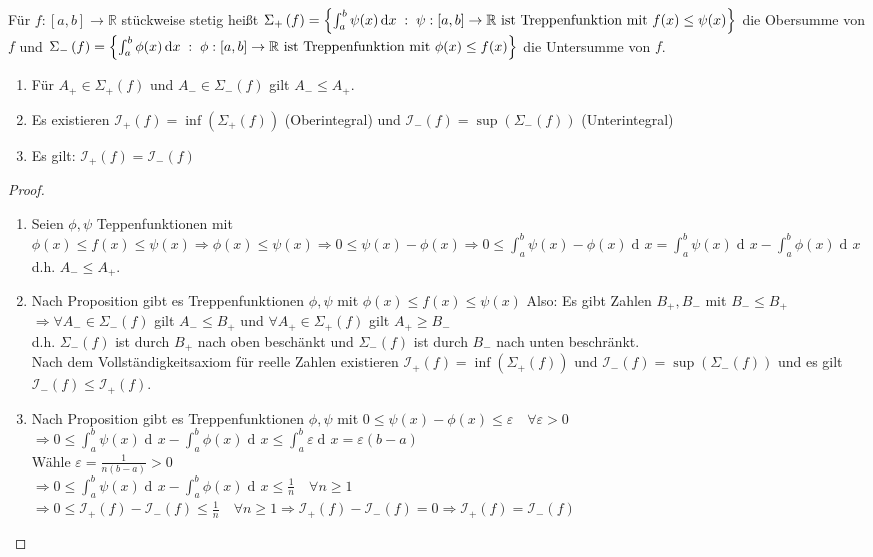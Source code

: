 \documentclass[a4paper,titlepage,oneside]{article}
\def\R{\ensuremath{\mathbb{R}} }
\renewcommand{\epsilon}{\ensuremath{\varepsilon} }
\newcommand{\der}{\operatorname{d\!}{}}
\def\sp{\hspace{0,1cm}}
\newcommand{\menge}[2]{\ensuremath{\left\{#1\sp : \sp #2\right\}}}
\newcommand{\integral}[4][x]{\ensuremath{\int_{#2}^{#3}{#4\der #1}}}
\newcommand{\intAB}[2][x]{\integral[#1]{a}{b}{#2}}
\newcommand{\OS}[1]{\ensuremath{\Sigma_+\left(#1\right)}}
\newcommand{\US}[1]{\ensuremath{\Sigma_-\left(#1\right)}}
\newcommand{\OI}[1]{\ensuremath{\mathcal{I}_+\left(#1\right)}}
\newcommand{\UI}[1]{\ensuremath{\mathcal{I}_-\left(#1\right)}}
\theoremstyle{thmstyle}
\begin{document}
\begin{defi}
Für $f :[a,b] \to \R$ stückweise stetig heißt $ \OS{f} = \menge{\intAB{\psi(x)}}{\psi : [a,b] \to \R \text{ ist Treppenfunktion mit } f(x) \le \psi(x)}$ die Obersumme von $f$ und $ \US{f} = \menge{\intAB{\phi(x)}}{\phi : [a,b] \to \R \text{ ist Treppenfunktion mit } \phi(x) \le f(x)}$ die Untersumme von $f$.
\end{defi}

\begin{satz}
\begin{enumerate}
\item Für $A_+ \in \OS{f}$ und $A_- \in \US{f}$ gilt $A_- \le A_+$.
\item Es existieren $\OI{f} = \inf(\OS{f})$ (Oberintegral) und  $\UI{f} = \sup(\US{f})$ (Unterintegral)
\item Es gilt: $\OI{f} = \UI{f}$
\end{enumerate}
\begin{proof}
\begin{enumerate}
\item Seien $\phi, \psi$ Teppenfunktionen mit $ \phi(x) \le f(x) \le \psi(x) \Rightarrow \phi(x) \le \psi(x) \Rightarrow 0 \le \psi(x) - \phi(x) \Rightarrow 0 \le \intAB{\psi(x) - \phi(x)} = \intAB{\psi(x)} - \intAB{\phi(x)}$ d.h. $A_- \le A_+$.
\item Nach Proposition gibt es Treppenfunktionen $\phi, \psi$ mit $\phi(x) \le f(x) \le \psi(x)$ Also: Es gibt Zahlen $B_+, B_-$ mit $B_- \le B_+$\\
$\Rightarrow \forall A_- \in \US{f}$ gilt $ A_- \le B_+$ und $\forall A_+ \in \OS{f}$ gilt $ A_+ \ge B_-$\\
d.h. $\US{f}$ ist durch $B_+$ nach oben beschänkt und $\US{f}$ ist durch $B_-$ nach unten beschränkt.\\
Nach dem Vollständigkeitsaxiom für reelle Zahlen existieren $\OI{f}  = \inf(\OS{f})$ und $\UI{f} = \sup(\US{f})$ und es gilt $\UI{f} \le \OI{f}$.
\item Nach Proposition gibt es Treppenfunktionen $\phi, \psi$ mit $ 0 \le \psi(x) - \phi(x) \le \epsilon \quad \forall \epsilon > 0$\\
$\Rightarrow 0 \le \intAB{\psi(x)} - \intAB{\phi(x)} \le \intAB{\epsilon} = \epsilon(b-a)$\\
Wähle $\displaystyle \epsilon = \frac{1}{n(b-a)} > 0$\\
$\Rightarrow 0 \le \intAB{\psi(x)} - \intAB{\phi(x)} \le \frac{1}{n} \quad \forall n \ge 1$ \\
$\Rightarrow 0 \le \OI{f} - \UI{f} \le \frac{1}{n} \quad \forall n \ge 1 \Rightarrow \OI{f} - \UI{f} = 0 \Rightarrow \OI{f} = \UI{f}$
\end{enumerate}
\end{proof}
\end{satz}
\end{document}
